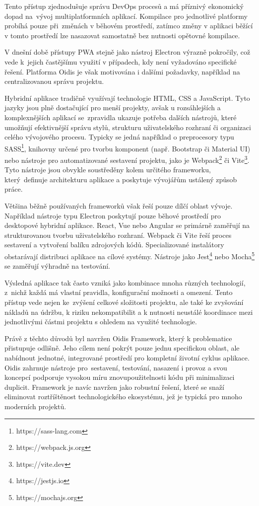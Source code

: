 Tento přístup zjednodušuje správu DevOps procesů a má příznivý ekonomický dopad na~vývoj multiplatformních aplikací. Kompilace pro jednotlivé platformy probíhá pouze při~změnách v běhovém prostředí, zatímco změny v aplikaci běžící v tomto prostředí lze nasazovat samostatně bez nutnosti opětovné kompilace.

V dnešní době přístupy PWA stejně jako nástroj Electron výrazně pokročily, což vede k~jejich častějšímu využití v případech, kdy není vyžadováno specifické řešení. Platforma Oidis je však motivována i dalšími požadavky, například na centralizovanou správu projektu.

Hybridní aplikace tradičně využívají technologie HTML, CSS a JavaScript. Tyto jazyky jsou plně dostačující pro menší projekty, avšak u rozsáhlejších a komplexnějších aplikací se~zpravidla ukazuje potřeba dalších nástrojů, které umožňují efektivnější správu stylů, strukturu uživatelského rozhraní či organizaci celého vývojového procesu. Typicky se jedná například o preprocesory typu SASS\footnote{https://sass-lang.com}, knihovny určené pro tvorbu komponent (např. Bootstrap či Material UI) nebo nástroje pro automatizované sestavení projektu, jako je Webpack\footnote{https://webpack.js.org} či Vite\footnote{https://vite.dev}. Tyto nástroje jsou obvykle soustředěny kolem určitého frameworku, který~definuje architekturu aplikace a poskytuje vývojářům ustálený způsob práce.

Většina běžně používaných frameworků však řeší pouze dílčí oblast vývoje. Například nástroje typu Electron poskytují pouze běhové prostředí pro desktopové hybridní aplikace. React, Vue nebo Angular se primárně zaměřují na strukturovanou tvorbu uživatelského rozhraní. Webpack či Vite řeší proces sestavení a vytvoření balíku zdrojových kódů. Specializované instalátory obstarávají distribuci aplikace na cílové systémy. Nástroje jako Jest\footnote{https://jestjs.io} nebo Mocha\footnote{https://mochajs.org} se zaměřují výhradně na testování.

Výsledná aplikace tak často vzniká jako kombinace mnoha různých technologií, z~nichž každá má vlastní pravidla, konfigurační možnosti a omezení. Tento přístup vede nejen ke~zvýšení celkové složitosti projektu, ale také ke zvyšování nákladů na údržbu, k riziku nekompatibilit a k nutnosti neustálé koordinace mezi jednotlivými částmi projektu s ohledem na využité technologie.

Právě z těchto důvodů byl navržen Oidis Framework, který k problematice přistupuje odlišně. Jeho cílem není pokrýt pouze jednu specifickou oblast, ale nabídnout jednotné, integrované prostředí pro kompletní životní cyklus aplikace. Oidis zahrnuje nástroje pro~sestavení, testování, nasazení i provoz a svou koncepcí podporuje vysokou míru znovupoužitelnosti kódu při minimalizaci duplicit. Framework je navíc navržen jako robustní řešení, které se snaží eliminovat roztříštěnost technologického ekosystému, jež je typická pro mnoho moderních projektů.

